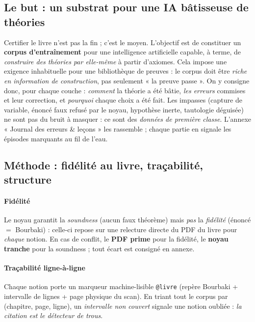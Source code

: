 \subsection*{Le but : un substrat pour une IA bâtisseuse de théories}

Certifier le livre n'est pas la fin ; c'est le moyen. L'objectif est de
constituer un \textbf{corpus d'entraînement} pour une intelligence artificielle
capable, à terme, de \emph{construire des théories par elle-même} à partir
d'axiomes. Cela impose une exigence inhabituelle pour une bibliothèque de
preuves : le corpus doit être \emph{riche en information de construction}, pas
seulement « la preuve passe ». On y consigne donc, pour chaque couche :
\emph{comment} la théorie a été bâtie, \emph{les erreurs} commises et leur
correction, et \emph{pourquoi} chaque choix a été fait. Les impasses (capture de
variable, énoncé faux refusé par le noyau, hypothèse inerte, tautologie
déguisée) ne sont pas du bruit à masquer : ce sont des \emph{données de première
classe}. L'annexe « Journal des erreurs \& leçons » les rassemble ; chaque
partie en signale les épisodes marquants au fil de l'eau.

\subsection*{Méthode : fidélité au livre, traçabilité, structure}

\paragraph{Fidélité} Le noyau garantit la \emph{soundness} (aucun faux
théorème) mais \emph{pas} la \emph{fidélité} (énoncé $=$ Bourbaki) : celle-ci
repose sur une relecture directe du PDF du livre pour \emph{chaque} notion. En
cas de conflit, le \textbf{PDF prime} pour la fidélité, le \textbf{noyau
tranche} pour la soundness ; tout écart est consigné en annexe.

\paragraph{Traçabilité ligne-à-ligne} Chaque notion porte un marqueur
machine-lisible \texttt{@livre} (repère Bourbaki + intervalle de lignes + page
physique du scan). En triant tout le corpus par (chapitre, page, ligne), un
\emph{intervalle non couvert} signale une notion oubliée : \emph{la citation est
le détecteur de trous}.

